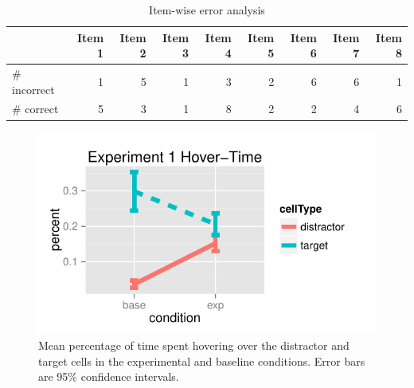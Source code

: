 \documentclass[10pt,letterpaper]{article}
\begin{document}
\begin{table}
\begin{center}
\begin{tabular}{ p{2cm} | r | r |  r | r | r | r | r | r |}
& Item 1 & Item 2 & Item 3 & Item 4 & Item 5 & Item 6 & Item 7 & Item 8\\\hline
\# incorrect & 1 & 5 & 1 & 3 & 2 &6 & 6 & 1 \\ 
\# correct & 5 & 3 & 1 & 8 & 2 & 2 & 4 & 6 \\
\end{tabular}
\caption{Item-wise error analysis}
\label{table:exp1ItemWise}
\end{center}
\end{table}

\begin{figure}[b!]
\begin{center}
\includegraphics[scale=.8]{images/exp1MouseTracking.pdf}
\caption{Mean percentage of time spent hovering over the distractor and target cells in the experimental and baseline conditions. Error bars are 95\% confidence intervals.}
\label{fig:exp1hover}
\end{center}
\end{figure}
\end{document}
